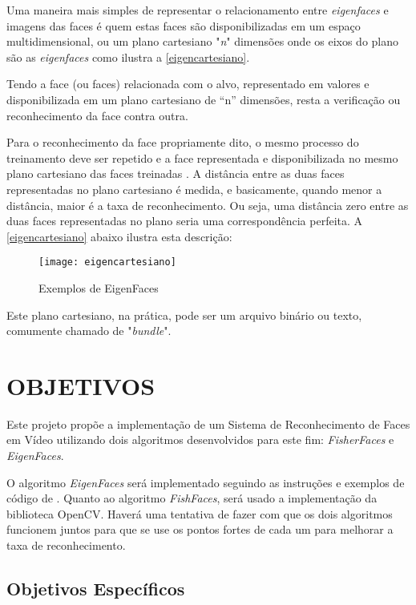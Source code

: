 Uma maneira mais simples de representar o relacionamento entre \textit{eigenfaces} e imagens das faces é quem estas faces são disponibilizadas em um espaço multidimensional, ou um plano cartesiano "\textit{n}" dimensões onde os eixos do plano são as \textit{eigenfaces} \cite{drmathew_java_programming} como ilustra a  \autoref{eigencartesiano}.

Tendo a face (ou faces) relacionada com o alvo, representado em valores e disponibilizada em um plano cartesiano de “n” dimensões, resta a verificação ou reconhecimento da face contra outra. 

Para o reconhecimento da face propriamente dito, o mesmo processo do treinamento deve ser repetido e a face representada e disponibilizada no mesmo plano cartesiano das faces treinadas \cite{drmathew_java_programming}. A distância entre as duas faces representadas no plano cartesiano é medida, e basicamente, quando menor a distância, maior é a taxa de reconhecimento. Ou seja, uma distância zero entre as duas faces representadas no plano seria uma correspondência perfeita. A \autoref{eigencartesiano} abaixo ilustra esta descrição:

\begin{figure}[h]
	\centering
	\texttt{[image: eigencartesiano]}
	\caption{Exemplos de EigenFaces}
	\label{eigencartesiano}
\end{figure}

Este plano cartesiano, na prática, pode ser um arquivo binário ou texto, comumente chamado de "\textit{bundle}".

\section{OBJETIVOS}\label{sec:objetivos}
Este projeto propõe a implementação de um Sistema de Reconhecimento de Faces em Vídeo utilizando dois algoritmos desenvolvidos para este fim: \textit{FisherFaces} e \textit{EigenFaces}.

O algoritmo \textit{EigenFaces} será implementado seguindo as instruções e exemplos de código de \cite{drmathew_java_programming}. Quanto ao algoritmo \textit{FishFaces}, será usado a implementação da biblioteca OpenCV. Haverá uma tentativa de fazer com que os dois algoritmos funcionem juntos para que se use os pontos fortes de cada um para melhorar a taxa de reconhecimento. 

\subsection{Objetivos Específicos}\label{sec:organizacao-trabalho}


